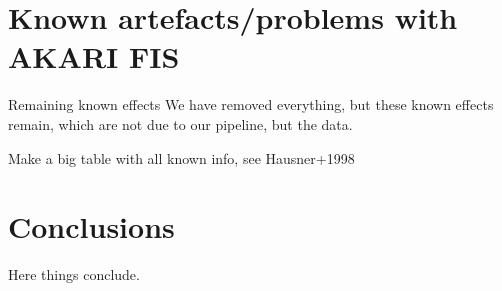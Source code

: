 \documentclass{aa}
\newcommand{\comment}[1]{{\color{teal}#1}}
\begin{document}
%
\section{Known artefacts/problems with AKARI FIS}
\label{sec:known-artefacts}
\comment{Remaining known effects}
\comment{We have removed everything, but these known effects remain, which are not due to our pipeline, but the data.}

\comment{Make a big table with all known info, see Hausner+1998}

\section{Conclusions}
\label{sec:conclusions}
\comment{Here things conclude.}




\end{document}
